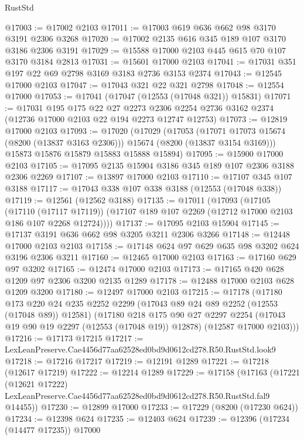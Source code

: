 \begin{lexlean}{RustStd}
\begin{coremodule}
@17003 := @17002 @2103
@17011 := @17003 @619 @636 @662 @98 @3170 @3191 @2306 @3268
@17020 := @17002 @2135 @616 @345 @189 @107 @3170 @3186 @2306 @3191
@17029 := @15588 @17000 @2103 @445 @615 @70 @107 @3170 @3184 @2813
@17031 := @15601 @17000 @2103
@17041 := @17031 @351 @197 @22 @69 @2798 @3169 @3183 @2736 @3153 @2374
@17043 := @12545 @17000 @2103
@17047 := @17043 @321 @22 @321 @2798
@17048 := @12554 @17000
@17053 := @17041 (@17047 (@12553 (@17048 @321)) @15831)
@17071 := @17031
    @195
    @175
    @22
    @27
    @2273
    @2306
    @2254
    @2736
    @3162
    @2374
    (@12736 @17000 @2103 @22 @194 @2273 @12747 @12753)
@17073 := @12819 @17000 @2103
@17093 := @17020
    (@17029
      (@17053
        (@17071 @17073 @15674 (@8200 (@13837 @3163 @2306)))
        @15674
        (@8200 (@13837 @3154 @3169)))
      @15873
      @15876
      @15879
      @15883
      @15888
      @15894)
@17095 := @15900 @17000 @2103
@17105 := @17095 @2135 @15904 @3186 @345 @189 @107 @2306 @3188 @2306 @2269
@17107 := @13897 @17000 @2103
@17110 := @17107 @345 @107 @3188
@17117 := @17043 @338 @107 @338 @3188 (@12553 (@17048 @338))
@17119 := @12561 (@12562 @3188)
@17135 := @17011
    (@17093
      (@17105
        (@17110 (@17117 @17119))
        (@17107 @189 @107 @2269 (@12712 @17000 @2103 @186 @107 @2268 @12724))))
@17137 := @17095 @2103 @15904
@17145 := @17137 @3191 @636 @662 @98 @3205 @3211 @2306 @3266
@17148 := @12448 @17000 @2103 @2103
@17158 := @17148 @624 @97 @629 @635 @98 @3202 @624 @3196 @2306 @3211
@17160 := @12465 @17000 @2103
@17163 := @17160 @629 @97 @3202
@17165 := @12474 @17000 @2103
@17173 := @17165 @420 @628 @1209 @97 @2306 @3200 @2135 @1289
@17178 := @12488 @17000 @2103 @628 @1209 @3200
@17180 := @12497 @17000 @2103
@17215 := @17178
    (@17180
      @173
      @220
      @24
      @235
      @2252
      @2299
      (@17043 @89 @24 @89 @2252 (@12553 (@17048 @89)) @12581)
      (@17180
        @218
        @175
        @90
        @27
        @2297
        @2254
        (@17043 @19 @90 @19 @2297 (@12553 (@17048 @19)) @12878)
        (@12587 @17000 @2103)))
@17216 := @17173 @17215
@17217 := LexLeanPreserve.Cae4456d77aa62528ed0bd9d0612cd278.R50.RustStd.look9
@17218 := @17216 @17217
@17219 := @12191 @1289
@17221 := @17218 (@12617 @17219)
@17222 := @12214 @1289
@17229 := @17158
    (@17163
      (@17221
        (@12621 @17222)
        LexLeanPreserve.Cae4456d77aa62528ed0bd9d0612cd278.R50.RustStd.fal9
        @14455))
@17230 := @12899 @17000
@17233 := @17229 (@8200 (@17230 @624))
@17234 := @12398 @624
@17235 := @12403 @624
@17239 := @12396 (@17234 (@14477 @17235)) @17000

\end{coremodule}
\end{lexlean}
